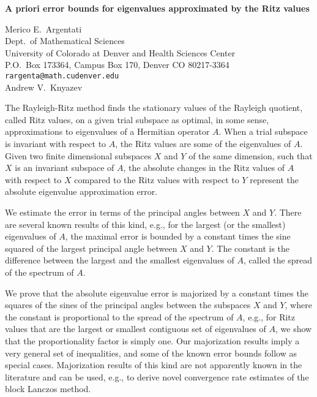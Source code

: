 \documentclass{report}
\begin{document}

\begin{center}
{\large
{\bf A priori error bounds for eigenvalues approximated by the Ritz values}}

	Merico E.~Argentati \\
	Dept.~of Mathematical Sciences \\
	 University of Colorado at Denver and Health Sciences Center \\
	 P.O.~Box 173364, Campus Box 170, Denver CO 80217-3364 \\
	{\tt rargenta@math.cudenver.edu} \\
	Andrew V.~Knyazev
\end{center}
The Rayleigh-Ritz method finds the stationary values of the
Rayleigh quotient, called Ritz values, on a given trial
subspace as optimal, in some sense, approximations to
eigenvalues of a Hermitian operator $A$. When a trial subspace
is invariant with respect to $A$, the Ritz values are some of
the eigenvalues of $A$. Given two finite dimensional subspaces
$X$ and $Y$ of the same dimension, such that $X$ is an invariant
subspace of $A$, the absolute changes in the Ritz values of $A$
with respect to $X$ compared to the Ritz values with respect
to $Y$ represent the absolute eigenvalue approximation error.

We estimate the error in terms of the principal angles
between $X$ and $Y$. There are several known results of this
kind, e.g., for the largest (or the smallest) eigenvalues of
$A$, the maximal error is bounded by a constant times the sine
squared of the largest principal angle between $X$ and $Y$. The
constant is the difference between the largest and the
smallest eigenvalues of $A$, called the spread of the spectrum
of $A$.

We prove that the absolute eigenvalue error is
majorized by a constant times the squares of the sines of
the principal angles between the subspaces $X$ and $Y$, where
the constant is proportional to the spread of the spectrum
of $A$, e.g., for Ritz values that are the largest or smallest
contiguous set of eigenvalues of $A$, we show that the
proportionality factor is simply one. Our majorization
results imply a very general set of inequalities, and some
of the known error bounds follow as special cases.
Majorization results of this kind are not apparently known
in the literature and can be used, e.g., to derive novel
convergence rate estimates of the block Lanczos method.




\end{document}
